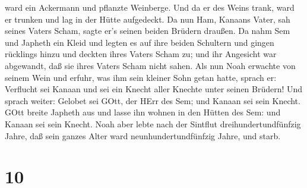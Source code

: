 ward ein Ackermann und pflanzte Weinberge.  Und da er des
Weins trank, ward er trunken und lag in der Hütte aufgedeckt.
 Da nun Ham, Kanaans Vater, sah seines Vaters Scham, sagte
er's seinen beiden Brüdern draußen.  Da nahm Sem und
Japheth ein Kleid und legten es auf ihre beiden Schultern und gingen
rücklings hinzu und deckten ihres Vaters Scham zu; und ihr Angesicht war
abgewandt, daß sie ihres Vaters Scham nicht sahen.  Als nun
Noah erwachte von seinem Wein und erfuhr, was ihm sein kleiner Sohn
getan hatte,  sprach er: Verflucht sei Kanaan und sei ein
Knecht aller Knechte unter seinen Brüdern!  Und sprach
weiter: Gelobet sei GOtt, der HErr des Sem; und Kanaan sei sein Knecht.
 GOtt breite Japheth aus und lasse ihn wohnen in den Hütten
des Sem: und Kanaan sei sein Knecht.  Noah aber lebte nach
der Sintflut dreihundertundfünfzig Jahre,  daß sein ganzes
Alter ward neunhundertundfünfzig Jahre, und starb.

\hypertarget{section-9}{%
\section{10}\label{section-9}}

